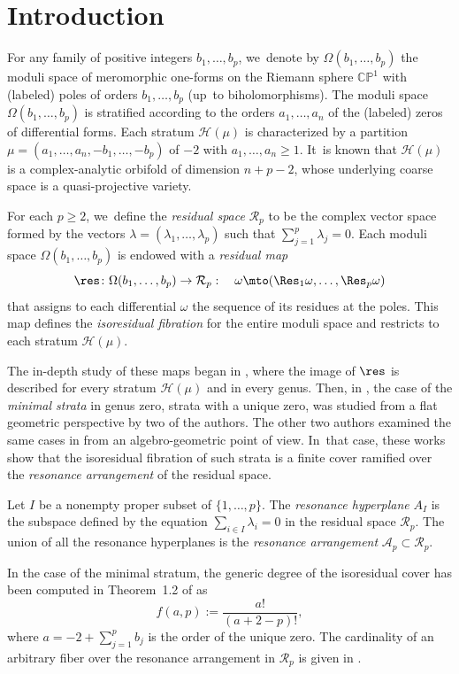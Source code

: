 \section{Introduction}

For any family of positive integers $b_{1},\dots,b_{p}$, we~denote by $\Omega(b_{1},\dots,b_{p})$ the moduli space of meromorphic one-forms on the Riemann sphere $\mathbb{CP}^{1}$ with (labeled) poles of orders $b_{1},\dots,b_{p}$ (up~to biholomorphisms). The moduli space $\Omega(b_{1},\dots,b_{p})$ is stratified according to the orders $a_{1},\dots,a_{n}$ of the (labeled) zeros of differential forms.
Each stratum $\mathcal{H}(\mu)$ is characterized by a partition $\mu=(a_{1},\dots,a_{n},-b_{1},\dots,-b_{p})$ of $-2$ with $a_{1},\dots,a_{n} \geq 1$. It~is known that $\mathcal{H}(\mu)$ is a complex-analytic orbifold of dimension $n+p-2$, whose underlying coarse space is a quasi-projective variety.

For each $p \geq 2$, we~define the \textit{residual space} $\mathcal{R}_{p}$ to be the complex vector space formed by the vectors $\lambda = (\lambda_{1},\dots,\lambda_{p})$ such that $\sum_{j=1}^{p} \lambda_{j} = 0$. Each moduli space $\Omega(b_{1},\dots,b_{p})$ is endowed with a \textit{residual map}
\[
\res\colon \Omega(b_{1},\dots,b_{p}) \to \mathcal{R}_{p}: \quad\omega \mto (\Res_{1}\omega,\dots,\Res_{p}\omega)
\]
that assigns to each differential $\omega$ the sequence of its residues at the poles. This map defines the \textit{isoresidual fibration} for the entire moduli space and restricts to each stratum $\mathcal{H}(\mu)$.

The in-depth study of these maps began in \cite{getaab}, where the image of $\res$ is described for every stratum $\mathcal{H}(\mu)$ and in every genus. Then, in \cite{GeTaIso}, the case of the {\em minimal strata} in genus zero, \ie strata with a unique zero, was studied from a flat geometric perspective by two of the authors. The other two authors examined the same cases in \cite{ChPrIso} from an algebro-geometric point of view. In~that case, these works show that the isoresidual fibration of such strata is a finite cover ramified over the \textit{resonance arrangement} of the residual space.
\begin{defn}\label{defn:resonanceintro}
Let $I$ be a nonempty proper subset of $\{1,\dots,p\}$. The \textit{resonance hyperplane} $A_{I}$ is the subspace defined by the equation $\sum_{i \in I} \lambda_{i} = 0$ in the residual space $\mathcal{R}_{p}$. The union of all the resonance hyperplanes is the \textit{resonance arrangement} $\mathcal{A}_{p} \subset \mathcal{R}_{p}$.
\end{defn}
In the case of the minimal stratum, the generic degree of the isoresidual cover has been computed in Theorem~1.2 of \cite{GeTaIso} as
\begin{equation}\label{eq:degree}
f(a,p):=\frac{a!}{(a+2-p)!},
\end{equation}
where $a = -2+\sum_{j=1}^{p}b_{j}$ is the order of the unique zero. The cardinality of an arbitrary fiber over the resonance arrangement in $\mathcal{R}_{p}$ is given in \cite[Th.\,1.2]{ChPrIso}.

